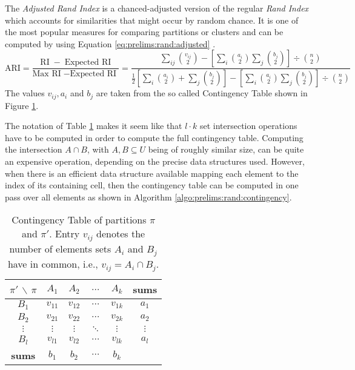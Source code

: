 		The \textit{Adjusted Rand Index} is a chanced-adjusted version of the regular \textit{Rand Index} which accounts for similarities that might occur by random chance.
		It is one of the most popular measures for comparing partitions or clusters and can be computed by using Equation \ref{eq:prelims:rand:adjusted} \cite{sundqvistAdjustingAdjustedRand2020}.
		\begin{equation}
			\label{eq:prelims:rand:adjusted}
			\mathrm{ARI} = \frac{\mathrm{RI}\; - \;\text{Expected RI}}{\text{Max RI}\; - \text{Expected RI} \;} = \frac{\sum\nolimits_{ij} \binom{v_{ij}}{2} - \left[ \sum\nolimits_i \binom{a_i}{2} \sum\nolimits_j \binom{b_j}{2} \right] \div \binom{n}{2}}{\frac{1}{2} \left[ \sum\nolimits_i \binom{a_i}{2} +  \sum\nolimits_j \binom{b_j}{2} \right] - \left[ \sum\nolimits_i \binom{a_i}{2} \sum\nolimits_j \binom{b_j}{2} \right] \div \binom{n}{2}}
		\end{equation}
		The values $v_{ij}, a_i$ and $b_j$ are taken from the so called Contingency Table shown in Figure \ref{fig:prelims:rand:contingency}.
		
		The notation of Table \ref{fig:prelims:rand:contingency} makes it seem like that $l \cdot k$ set intersection operations have to be computed in order to compute the full contingency table.
		Computing the intersection $A \cap B$, with $A, B \subseteq U$ being of roughly similar size, can be quite an expensive operation, depending on the precise data structures used.
		However, when there is an efficient data structure available mapping each element to the index of its containing cell, then the contingency table can be computed in one pass over all elements as shown in Algorithm \ref{algo:prelims:rand:contingency}.
		
		\begin{table}[h!]
			\centering
			\begin{tabular}{c|cccc|c}
				$\pi'$ $\backslash$ $\pi$ & $A_1$ & $A_2$ & $\ldots$ & $A_k$ & \textbf{sums} \\
				\toprule
				$B_1$ & $v_{11}$ & $v_{12}$ & $\cdots$ & $v_{1k}$ & $a_1$ \\
				$B_2$ & $v_{21}$ & $v_{22}$ & $\cdots$ & $v_{2k}$ & $a_2$ \\
				$\vdots$ & $\vdots$ & $\vdots$ & $\ddots$ & $\vdots$ & $\vdots$\\
				$B_l$ & $v_{l1}$ & $v_{l2}$ & $\cdots$ & $v_{lk}$ & $a_l$ \\
				\midrule
				\textbf{sums} & $b_1$ & $b_2$ & $\cdots$ & $b_k$ &
			\end{tabular}
			\caption{Contingency Table of partitions $\pi$ and $\pi'$. Entry $v_{ij}$ denotes the number of elements sets $A_i$ and $B_j$ have in common, i.e., $v_{ij} = A_i \cap B_j$.}
			\label{fig:prelims:rand:contingency}
		\end{table}
		
